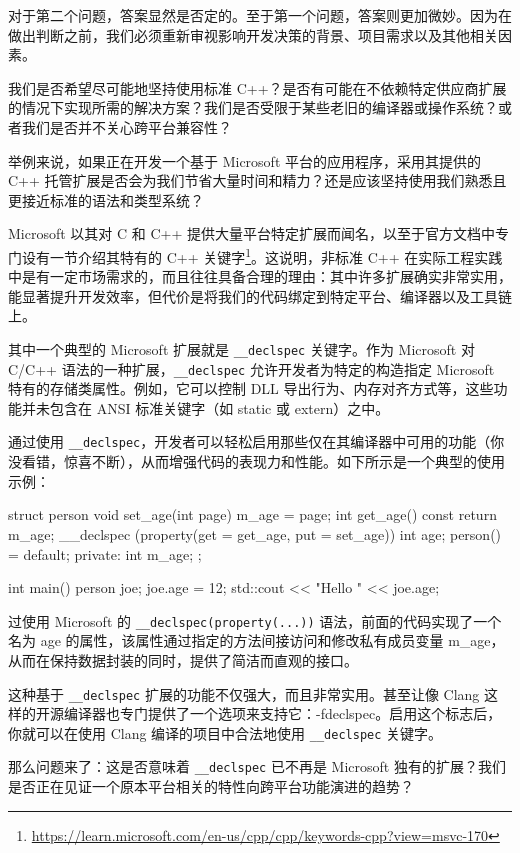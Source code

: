 对于第二个问题，答案显然是否定的。至于第一个问题，答案则更加微妙。因为在做出判断之前，我们必须重新审视影响开发决策的背景、项目需求以及其他相关因素。

我们是否希望尽可能地坚持使用标准 C++？是否有可能在不依赖特定供应商扩展的情况下实现所需的解决方案？我们是否受限于某些老旧的编译器或操作系统？或者我们是否并不关心跨平台兼容性？

举例来说，如果正在开发一个基于 Microsoft 平台的应用程序，采用其提供的 C++ 托管扩展是否会为我们节省大量时间和精力？还是应该坚持使用我们熟悉且更接近标准的语法和类型系统？

Microsoft 以其对 C 和 C++ 提供大量平台特定扩展而闻名，以至于官方文档中专门设有一节介绍其特有的 C++ 关键字\footnote{\url{https://learn.microsoft.com/en-us/cpp/cpp/keywords-cpp?view=msvc-170}}。这说明，非标准 C++ 在实际工程实践中是有一定市场需求的，而且往往具备合理的理由：其中许多扩展确实非常实用，能显著提升开发效率，但代价是将我们的代码绑定到特定平台、编译器以及工具链上。

其中一个典型的 Microsoft 扩展就是 \verb|__declspec| 关键字。作为 Microsoft 对 C/C++ 语法的一种扩展，\verb|__declspec| 允许开发者为特定的构造指定 Microsoft 特有的存储类属性。例如，它可以控制 DLL 导出行为、内存对齐方式等，这些功能并未包含在 ANSI 标准关键字（如 static 或 extern）之中。

通过使用 \verb|__declspec|，开发者可以轻松启用那些仅在其编译器中可用的功能（你没看错，惊喜不断），从而增强代码的表现力和性能。如下所示是一个典型的使用示例：

\begin{cpp}
struct person {
  void set_age(int page) { m_age = page; }
  int get_age() const { return m_age; }
  __declspec (property(get = get_age, put = set_age)) int age;
  person() = default;
private:
  int m_age;
};

int main() {
  person joe;
  joe.age = 12;
  std::cout << "Hello " << joe.age;
}
\end{cpp}

过使用 Microsoft 的 \verb|__declspec(property(...))| 语法，前面的代码实现了一个名为 age 的属性，该属性通过指定的方法间接访问和修改私有成员变量 m\_age，从而在保持数据封装的同时，提供了简洁而直观的接口。

这种基于 \verb|__declspec| 扩展的功能不仅强大，而且非常实用。甚至让像 Clang 这样的开源编译器也专门提供了一个选项来支持它：-fdeclspec。启用这个标志后，你就可以在使用 Clang 编译的项目中合法地使用 \verb|__declspec| 关键字。

那么问题来了：这是否意味着 \verb|__declspec| 已不再是 Microsoft 独有的扩展？我们是否正在见证一个原本平台相关的特性向跨平台功能演进的趋势？


